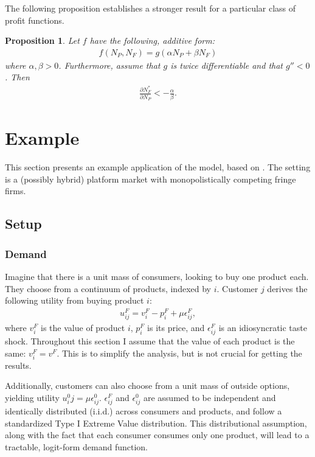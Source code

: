 \documentclass[a4paper]{article}
\newtheorem{proposition}{Proposition}
\begin{document}
The following proposition establishes a stronger result for a particular class of profit functions.
\begin{proposition}
    \label{prop:aggregate_size_additive}
    Let $f$ have the following, additive form:
    \begin{align*}
        f(N_P, N_F) = g(\alpha N_P + \beta N_F)
    \end{align*}
    where $\alpha, \beta > 0$.
    Furthermore, assume that $g$ is twice differentiable and that $g'' < 0$.
    Then
    \begin{align*}
        \frac{\partial N_F^*}{\partial N_P} < -\frac{\alpha}{\beta}.
    \end{align*}
\end{proposition}


\section{Example}
\label{sec:example}

This section presents an example application of the model, based on \parencite[]{anderson2021hybrid}.
The setting is a (possibly hybrid) platform market with monopolistically competing fringe firms.

\subsection{Setup}

\subsubsection{Demand}

Imagine that there is a unit mass of consumers, looking to buy one product each.
They choose from a continuum of products, indexed by $i$.
Customer $j$ derives the following utility from buying product $i$:
\begin{align*}
    u^F_{ij} = v^F_i - p^F_i + \mu\epsilon^F_{ij},
\end{align*}
where $v^F_i$ is the value of product $i$, $p^F_i$ is its price, and $\epsilon^F_{ij}$ is an idiosyncratic taste shock.
Throughout this section I assume that the value of each product is the same: $v^F_i = v^F$.
This is to simplify the analysis, but is not crucial for getting the results.  %

Additionally, customers can also choose from a unit mass of outside options, yielding utility $u^0_ij = \mu\epsilon^0_{ij}$. $\epsilon^F_{ij}$ and $\epsilon^0_{ij}$ are assumed to be independent and identically distributed (i.i.d.) across consumers and products, and follow a standardized Type I Extreme Value distribution. This distributional assumption, along with the fact that each consumer consumes only one product, will lead to a tractable, logit-form demand function.
\end{document}
